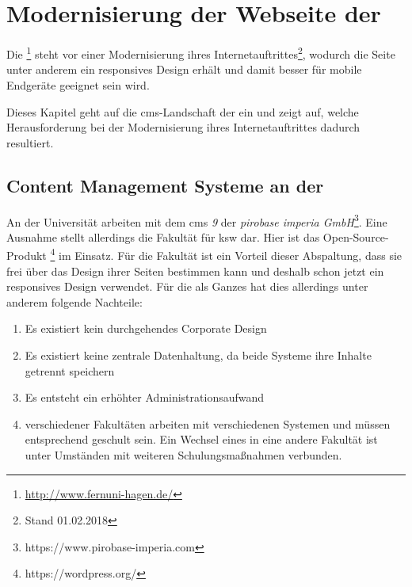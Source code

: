     \section{Modernisierung der Webseite der \fernUni}
        \label{chapter:FernUniRelaunch}
        Die \fernUni\footnote{\url{http://www.fernuni-hagen.de/}}
        steht vor einer Modernisierung ihres Internetauftrittes\footnote{Stand 01.02.2018},
        wodurch die Seite unter anderem ein responsives Design erhält und damit besser für
        mobile Endgeräte geeignet sein wird.

        Dieses Kapitel geht auf die \gls{cms}-Landschaft der {\fernUni} ein und zeigt auf,
        welche Herausforderung bei der Modernisierung ihres Internetauftrittes dadurch resultiert. 

        \subsection{Content Management Systeme an der \fernUni}
            \label{section:fernUniCMS}
            An der Universität arbeiten {\editors} mit dem \gls{cms} \textit{{\imperia} 9}
            \cite{fernUni:imperia}
            der \textit{pirobase imperia GmbH}\footnote{https://www.pirobase-imperia.com}.
            Eine Ausnahme stellt allerdings die Fakultät für \gls{ksw} dar.
            Hier ist das Open-Source-Produkt \textit{\wordpress}\footnote{https://wordpress.org/} im Einsatz.
            Für die Fakultät ist ein Vorteil dieser Abspaltung,
            dass sie frei über das Design ihrer Seiten bestimmen kann
            und deshalb schon jetzt ein responsives Design verwendet.
            Für die {\fernUni} als Ganzes hat dies allerdings unter anderem folgende Nachteile:

            \begin{enumerate}
                \item   Es existiert kein durchgehendes Corporate Design
                \item   Es existiert keine zentrale Datenhaltung, da beide Systeme ihre Inhalte getrennt speichern
                \item   Es entsteht ein erhöhter Administrationsaufwand
                \item   {\editors} verschiedener Fakultäten arbeiten mit verschiedenen Systemen und müssen entsprechend geschult sein.
                        Ein Wechsel eines {\editors} in eine andere Fakultät ist unter Umständen mit weiteren Schulungsmaßnahmen verbunden.
            \end{enumerate}

